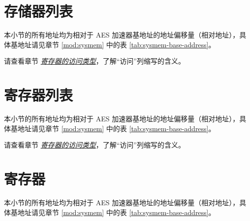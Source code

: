 \documentclass[main\_\_CN.tex]{subfiles}
\begin{document}
\section{存储器列表}

本小节的所有地址均为相对于 AES 加速器基地址的地址偏移量（相对地址），具体基地址请见章节 \ref{mod:sysmem} \textit{} 中的表 \ref{tab:sysmem-base-address}。

请查看章节 \hyperref[glossary-access-types]{\textit{寄存器的访问类型}}，了解“访问”列缩写的含义。




\hypertarget{aes-reg-summ}{}
\section{寄存器列表}

本小节的所有地址均为相对于 AES 加速器基地址的地址偏移量（相对地址），具体基地址请见章节 \ref{mod:sysmem} \textit{} 中的表 \ref{tab:sysmem-base-address}。

请查看章节 \hyperref[glossary-access-types]{\textit{寄存器的访问类型}}，了解“访问”列缩写的含义。




\clearpage
\section{寄存器}

本小节的所有地址均为相对于 AES 加速器基地址的地址偏移量（相对地址），具体基地址请见章节 \ref{mod:sysmem} \textit{} 中的表 \ref{tab:sysmem-base-address}。


\end{document}
